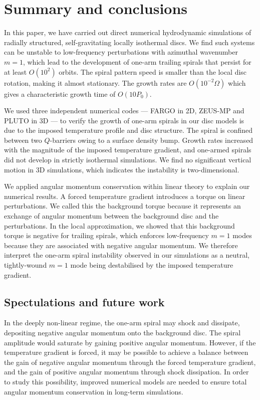 \section{Summary and conclusions}\label{summary}
In this paper, we have carried out direct numerical hydrodynamic
simulations of radially structured, self-gravitating locally
isothermal discs.     
We find such systems can be unstable to low-frequency perturbations
with azimuthal wavenumber $m=1$, which lead to the development of one-arm 
trailing spirals that persist for at least $O(10^2)$ orbits. The 
spiral pattern speed is smaller than the local disc rotation, making
it almost stationary. The growth rates are $O(10^{-2}\Omega)$ which
gives a characteristic growth time of $O(10P_0)$. 

We used three independent numerical codes --- FARGO in 2D, ZEUS-MP and
PLUTO in 3D --- to verify the growth of  
one-arm spirals in our disc models is due to the imposed temperature
profile and disc structure. The spiral is confined between two
$Q$-barriers owing to a surface density bump. Growth rates increased
with the magnitude of the imposed temperature gradient, and one-armed
spirals did not develop in strictly isothermal simulations.  
We find no significant vertical 
motion in 3D simulations, which indicates the instability is
two-dimensional. 

We applied angular momentum conservation within linear theory to
explain our numerical results. A  
forced temperature gradient introduces a torque on linear 
perturbations. We called this the background torque because it
represents an exchange of angular momentum between the background disc
and the perturbations. In the local approximation, we showed that this
background torque is negative for trailing spirals, which enforces  
low-frequency $m=1$ modes because they are associated with negative
angular momentum. We therefore interpret the one-arm spiral instability
observed in our simulations as a neutral, tightly-wound $m=1$ mode
being destabilised by the imposed temperature gradient.  

\subsection{Spectulations and future work}
In the deeply non-linear regime, the one-arm spiral may 
shock and dissipate, depositing negative angular momentum onto
the background disc. The spiral amplitude would saturate by gaining
positive angular momentum. However, if the temperature gradient is
forced, it may be possible to achieve a balance between the gain of negative
angular momentum through the forced temperature gradient, and the gain
of positive angular momentum through shock dissipation. In order to
study this possibility, improved numerical models are needed to ensure 
total angular momentum conservation in long-term simulations.  

